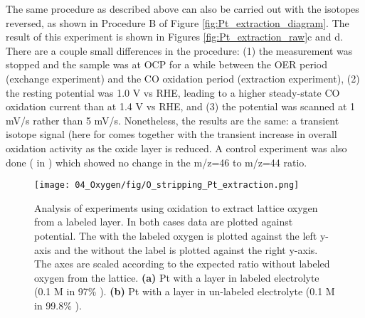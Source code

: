 The same procedure as described above can also be carried out with the isotopes reversed, as shown in Procedure B of Figure \ref{fig:Pt_extraction_diagram}. The result of this experiment is shown in Figures \ref{fig:Pt_extraction_raw}c and d. There are a couple small differences in the procedure: (1) the measurement was stopped and the sample was at OCP for a while between the OER period (exchange experiment) and the CO oxidation period (extraction experiment), (2) the resting potential was 1.0 V vs RHE, leading to a higher steady-state CO oxidation current than at 1.4 V vs RHE, and (3) the potential was scanned at 1 mV/s rather than 5 mV/s. Nonetheless, the results are the same: a transient isotope signal (here for  comes together with the transient increase in overall  oxidation activity as the oxide layer is reduced. A control experiment was also done ( in ) which showed no change in the m/z=46 to m/z=44 ratio.

\begin{figure}[t]
	\centering
	\texttt{[image: 04\_Oxygen/fig/O\_stripping\_Pt\_extraction.png]}
	\caption{
		Analysis of experiments using  oxidation to extract lattice oxygen from a labeled  layer. In both cases data are plotted against potential. The  with the labeled oxygen is plotted against the left y-axis and the  without the label is plotted against the right y-axis. The axes are scaled according to the expected ratio without labeled oxygen from the lattice. \textbf{(a)} Pt with a  layer in labeled electrolyte (0.1 M  in 97\% ). \textbf{(b)} Pt with a  layer in un-labeled electrolyte (0.1 M  in 99.8\% ).
	}
	\label{fig:Pt_extraction}
\end{figure}

